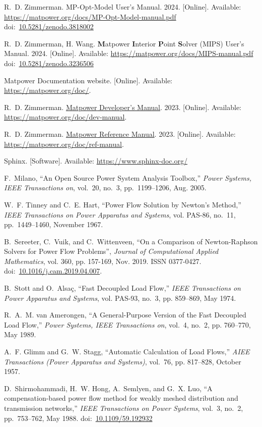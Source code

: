 \documentclass[12pt]{article}
\newcommand{\matpower}[0]{{\sc Matpower}}
\newcommand{\mips}[0]{{MIPS}}
\newcommand{\mipsname}[0]{{{\bf M}{\sc atpower} \textbf{I}nterior \textbf{P}oint \textbf{S}olver}}
\newcommand{\mpom}[0]{\mbox{MP-Opt-Model}}
\newcommand{\mpomname}[0]{\mpom{}}
\newcommand{\mdmurl}[0]{https://matpower.org/doc/dev-manual}
\newcommand{\mdm}[0]{\href{\mdmurl}{\matpower{} Developer's Manual}}
\newcommand{\mrmurl}[0]{https://matpower.org/doc/ref-manual}
\newcommand{\mrm}[0]{\href{\mrmurl}{\matpower{} Reference Manual}}
\newcommand{\currentmipsmanurl}[0]{https://matpower.org/docs/MIPS-manual.pdf}
\newcommand{\currentmpommanurl}[0]{https://matpower.org/docs/MP-Opt-Model-manual.pdf}
\newcommand{\doi}[1]{doi:~\href{https://doi.org/#1}{#1}}
\numberwithin{equation}{section}
\numberwithin{table}{section}
\numberwithin{figure}{section}
\begin{document}
\begin{thebibliography}{99}
R.~D. Zimmerman. \mpomname{} User's Manual. 2024. [Online]. Available: \url{\currentmpommanurl}\\
\doi{10.5281/zenodo.3818002}

R.~D. Zimmerman, H. Wang. \mipsname{} (\mips{}) User's Manual. 2024. [Online]. Available: \url{\currentmipsmanurl}
\doi{10.5281/zenodo.3236506}

\matpower{} Documentation website. [Online]. Available: \url{https://matpower.org/doc/}.

R.~D. Zimmerman. \mdm. 2023. [Online]. Available: \url{\mdmurl}.

R.~D. Zimmerman. \mrm. 2023. [Online]. Available: \url{\mrmurl}.

Sphinx. [Software]. Available: \url{https://www.sphinx-doc.org/}

F.~Milano, ``An Open Source Power System Analysis Toolbox,'' \emph{Power
  Systems, IEEE Transactions on}, vol.~20, no.~3, pp.~1199--1206, Aug. 2005.

W.~F. Tinney and C.~E. Hart, ``Power Flow Solution by Newton's Method,''
  \emph{IEEE Transactions on Power Apparatus and Systems}, vol. PAS-86, no.~11,
  pp.~1449--1460, November 1967.

B.~Sereeter, C.~Vuik, and C.~Wittenveen, ``On a Comparison of Newton-Raphson Solvers for Power Flow Problems'', \emph{Journal of Computational Applied Mathematics}, vol. 360, pp. 157-169, Nov. 2019. ISSN 0377-0427. \doi{10.1016/j.cam.2019.04.007}.

B.~Stott and O.~Alsa{\c c}, ``Fast Decoupled Load Flow,'' \emph{IEEE
  Transactions on Power Apparatus and Systems}, vol. PAS-93, no.~3, pp.
  859--869, May 1974.

R.~A.~M. van Amerongen, ``A General-Purpose Version of the Fast Decoupled Load
  Flow,'' \emph{Power Systems, IEEE Transactions on}, vol.~4, no.~2, pp.
  760--770, May 1989.

A.~F. Glimm and G.~W. Stagg, ``Automatic Calculation of Load Flows,''
  \emph{AIEE Transactions (Power Apparatus and Systems)}, vol.~76, pp.
  817--828, October 1957.

D.~Shirmohammadi, H.~W. Hong, A.~Semlyen, and G.~X. Luo, ``A compensation-based
  power flow method for weakly meshed distribution and transmission networks,''
  \emph{IEEE Transactions on Power Systems}, vol.~3, no.~2, pp.~753--762, May
  1988.
  \doi{10.1109/59.192932}


\end{thebibliography}
\end{document}
